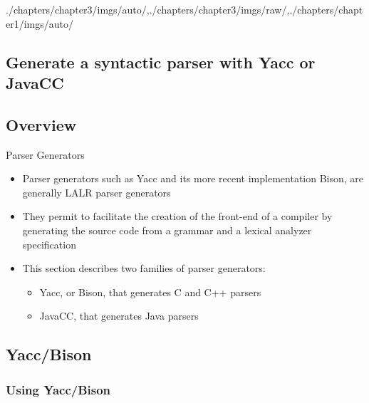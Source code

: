 \begin{graphicspathcontext}{{./chapters/chapter3/imgs/auto/},{./chapters/chapter3/imgs/raw/},{./chapters/chapter1/imgs/auto/}}
\begin{bibunit}[apalike]
\section[Parser Generators]{Generate a syntactic parser with Yacc or JavaCC}
\sectiontableofcontentslide*

\subsection{Overview}

\begin{frame}{Parser Generators}
	\begin{itemize}
	\item Parser generators such as Yacc and its more recent implementation Bison, are generally LALR parser generators
	\item They permit to facilitate the creation of the front-end of a compiler by generating the source code from a grammar and a lexical analyzer specification
	\vfill
	\item This section describes two families of parser generators:
		\begin{itemize}
		\item Yacc, or Bison, that generates C and C++ parsers
		\item JavaCC, that generates Java parsers
		\end{itemize}
	\end{itemize}
	\begin{center}
	\end{center}
\end{frame}

\subsection{Yacc/Bison}
\subsectiontableofcontentslide*

\subsubsection{Using Yacc/Bison}



\end{bibunit}
\end{graphicspathcontext}
